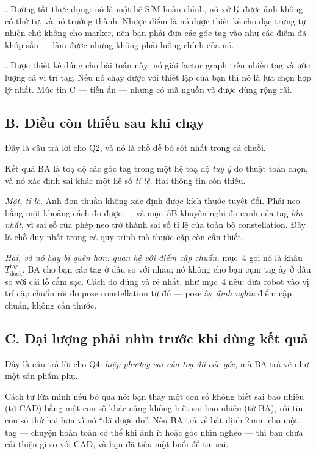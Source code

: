 \documentclass[../../marker.tex]{subfiles}
\begin{document}
\emph{ \cite{schoenberger2016colmap}.} Đường tắt thực dụng: nó là một hệ SfM hoàn chỉnh, nó xử lý được ảnh không có thứ tự, và nó trưởng thành. Nhược điểm là nó được thiết kế cho đặc trưng tự nhiên chứ không cho marker, nên bạn phải đưa các góc tag vào như các điểm đã khớp sẵn --- làm được nhưng không phải luồng chính của nó.

\emph{ \cite{pfrommer2019tagslam}.} Được thiết kế đúng cho bài toán này: nó giải factor graph trên nhiều tag và ước lượng cả vị trí tag. Nếu nó chạy được với thiết lập của bạn thì nó là lựa chọn hợp lý nhất. Mức tin C --- tiền ấn --- nhưng có mã nguồn và được dùng rộng rãi.

\subsection{B. Điều còn thiếu sau khi chạy}

Đây là câu trả lời cho Q2, và nó là chỗ dễ bỏ sót nhất trong cả chuỗi.

Kết quả BA là toạ độ các góc tag trong một hệ toạ độ \emph{tuỳ ý} do thuật toán chọn, và nó xác định sai khác một hệ số \emph{tỉ lệ}. Hai thông tin còn thiếu.

\emph{Một, tỉ lệ.} Ảnh đơn thuần không xác định được kích thước tuyệt đối. Phải neo bằng một khoảng cách đo được --- và  mục~5B khuyến nghị đo cạnh của tag \emph{lớn nhất}, vì sai số của phép neo trở thành sai số tỉ lệ của toàn bộ constellation. Đây là chỗ duy nhất trong cả quy trình mà thước cặp còn cần thiết.

\emph{Hai, và nó hay bị quên hơn: quan hệ với điểm cập chuẩn.}  mục~4 gọi nó là khâu \(T^{\text{tag}}_{\text{dock}}\). BA cho bạn các tag ở đâu so với nhau; nó không cho bạn cụm tag ấy ở đâu so với cái lỗ cắm sạc. Cách đo đúng và rẻ nhất, như  mục~4 nêu: đưa robot vào vị trí cập chuẩn rồi đo pose constellation từ đó --- pose ấy \emph{định nghĩa} điểm cập chuẩn, không cần thước.

\subsection{C. Đại lượng phải nhìn trước khi dùng kết quả}

Đây là câu trả lời cho Q4: \emph{hiệp phương sai của toạ độ các góc}, mà BA trả về như một sản phẩm phụ.

Cách tự lừa mình nếu bỏ qua nó: bạn thay một con số không biết sai bao nhiêu (từ CAD) bằng một con số khác cũng không biết sai bao nhiêu (từ BA), rồi tin con số thứ hai hơn vì nó ``đã được đo''. Nếu BA trả về bất định 2\,mm cho một tag --- chuyện hoàn toàn có thể khi ảnh ít hoặc góc nhìn nghèo --- thì bạn chưa cải thiện gì so với CAD, và bạn đã tiêu một buổi để tin sai.
\end{document}
